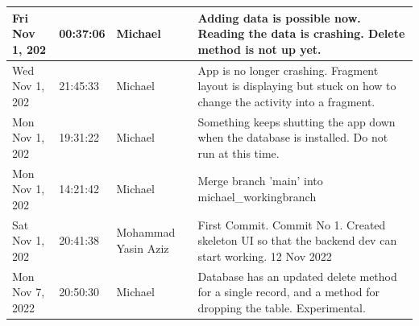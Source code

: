 \documentclass[11pt]{article}
\begin{document}
\begin{center}
\begin{longtable}{|p{2.7cm}|l|p{2cm}|p{8cm}|}
           \hline Fri Nov 1,  202                              & 00:37:06                           & Michael                                 & Adding data is possible now. Reading the data is crashing. Delete method is not up yet.                                                                                                                                                                                                                    \\
           \hline Wed Nov 1,  202                              & 21:45:33                           & Michael                                 & App is no longer crashing. Fragment layout is displaying but stuck on how to change the activity into a fragment.                                                                                                                                                                                          \\
           \hline Mon Nov 1,  202                              & 19:31:22                           & Michael                                 & Something keeps shutting the app down when the database is installed. Do not run at this time.                                                                                                                                                                                                             \\
           \hline Mon Nov 1,  202                              & 14:21:42                           & Michael                                 & Merge branch 'main' into michael\_workingbranch                                                                                                                                                                                                                                                             \\
           \hline Sat Nov 1,  202                              & 20:41:38                           & Mohammad Yasin Aziz                     & First Commit. Commit No 1. Created skeleton UI so that the backend dev can start working. 12 Nov 2022                                                                                                                                                                                                      \\
           \hline Mon Nov 7, 2022                            & 20:50:30                           & Michael                                 & Database has an updated delete method for a single record, and a method for dropping the table. Experimental.                                                                                                                                                                                              \\

\end{longtable}
\end{center}
\end{document}
